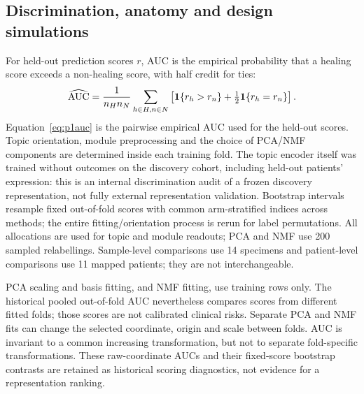 \documentclass[10pt,a4paper]{article}
\begin{document}
\subsection{Discrimination, anatomy and design simulations}
For held-out prediction scores $r$, AUC is the empirical probability that a healing score exceeds a non-healing score, with half credit for ties:
\begin{equation}
\widehat{\rm AUC}=\frac1{n_Hn_N}\sum_{h\in H,n\in N}\left[\mathbf{1}\{r_h>r_n\}+\tfrac12\mathbf{1}\{r_h=r_n\}\right].\label{eq:p1auc}
\end{equation}
Equation~\eqref{eq:p1auc} is the pairwise empirical AUC used for the held-out scores. Topic orientation, module preprocessing and the choice of PCA/NMF components are determined inside each training fold. The topic encoder itself was trained without outcomes on the discovery cohort, including held-out patients' expression: this is an internal discrimination audit of a frozen discovery representation, not fully external representation validation. Bootstrap intervals resample fixed out-of-fold scores with common arm-stratified indices across methods; the entire fitting/orientation process is rerun for label permutations. All allocations are used for topic and module readouts; PCA and NMF use 200 sampled relabellings. Sample-level comparisons use 14 specimens and patient-level comparisons use 11 mapped patients; they are not interchangeable.

PCA scaling and basis fitting, and NMF fitting, use training rows only. The historical pooled out-of-fold AUC nevertheless compares scores from different fitted folds; those scores are not calibrated clinical risks. Separate PCA and NMF fits can change the selected coordinate, origin and scale between folds. AUC is invariant to a common increasing transformation, but not to separate fold-specific transformations. These raw-coordinate AUCs and their fixed-score bootstrap contrasts are retained as historical scoring diagnostics, not evidence for a representation ranking.
\end{document}
